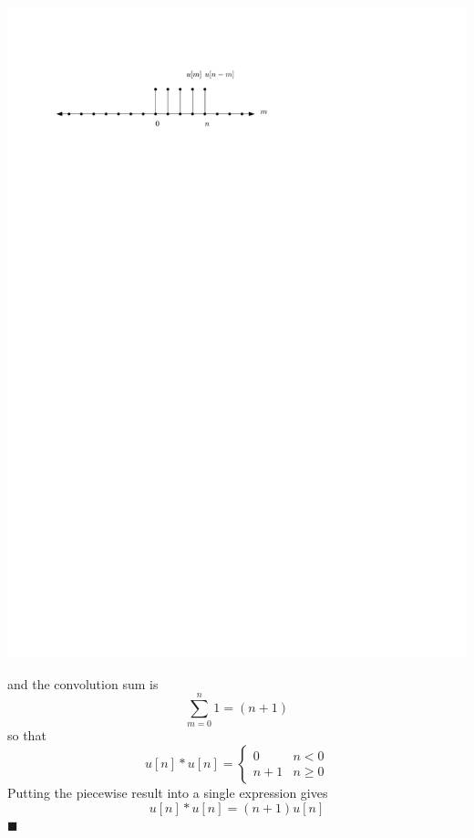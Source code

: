 \begin{example}
\begin{center}
    \includegraphics[scale=1]{graphics/dt-step-step-conv2.pdf}
  \end{center}
  and the convolution sum is
  \[
  \sum\limits_{m = 0}^{n} 1 = (n+1)
  \]
  so that
  \[
  u[n] * u[n] = \left\{ \begin{array}{lc}
    0 & n < 0\\
    n+1 & n \geq 0
  \end{array}
  \right.
  \]
  Putting the piecewise result into a single expression gives
  \[
  u[n] * u[n] = (n+1)u[n]
  \]
  $\blacksquare$
\end{example}

